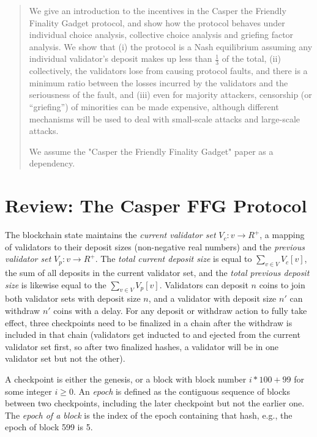 \documentclass[12pt, final]{article}
\begin{document}
\maketitle

\begin{abstract}
We give an introduction to the incentives in the Casper the Friendly Finality Gadget protocol, and show how the protocol behaves under individual choice analysis, collective choice analysis and griefing factor analysis. We show that (i) the protocol is a Nash equilibrium assuming any individual validator's deposit makes up less than $\frac{1}{3}$ of the total, (ii) collectively, the validators lose from causing protocol faults, and there is a minimum ratio between the losses incurred by the validators and the seriousness of the fault, and (iii) even for majority attackers, censorship (or ``griefing'') of minorities can be made expensive, although different mechanisms will be used to deal with small-scale attacks and large-scale attacks.

We assume the "Casper the Friendly Finality Gadget" paper as a dependency.
\end{abstract}

\section{Review: The Casper FFG Protocol}
\label{sect:casperprotocol}

The blockchain state maintains the \textit{current validator set} $V_c: v \rightarrow R^+$, a mapping of validators to their deposit sizes (non-negative real numbers) and the \textit{previous validator set} $V_p: v \rightarrow R^+$. The \textit{total current deposit size} is equal to $\sum_{v \in V} V_c[v]$, the sum of all deposits in the current validator set, and the \textit{total previous deposit size} is likewise equal to the $\sum_{v \in V} V_p[v]$. Validators can deposit $n$ coins to join both validator sets with deposit size $n$, and a validator with deposit size $n'$ can withdraw $n'$ coins with a delay. For any deposit or withdraw action to fully take effect, three checkpoints need to be finalized in a chain after the withdraw is included in that chain (validators get inducted to and ejected from the current validator set first, so after two finalized hashes, a validator will be in one validator set but not the other). 

A checkpoint is either the genesis, or a block with block number $i * 100 + 99$ for some integer $i \ge 0$. An \emph{epoch} is defined as the contiguous sequence of blocks between two checkpoints, including the later checkpoint but not the earlier one.  The \textit{epoch of a block} is the index of the epoch containing that hash, e.g., the epoch of block 599 is 5. 
\end{document}
